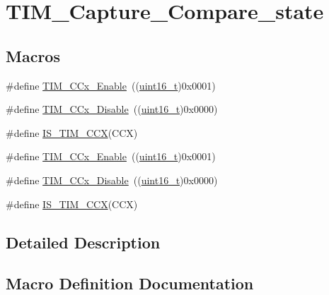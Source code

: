 \hypertarget{group___t_i_m___capture___compare__state}{}\section{T\+I\+M\+\_\+\+Capture\+\_\+\+Compare\+\_\+state}
\label{group___t_i_m___capture___compare__state}
\subsection*{Macros}
\begin{DoxyCompactItemize}
\item 
\#define \hyperlink{group___t_i_m___capture___compare__state_ga6acaeb60dad50ce9799ae9f62ed7719a}{T\+I\+M\+\_\+\+C\+Cx\+\_\+\+Enable}~((\hyperlink{_p_e___types_8h_a1f1825b69244eb3ad2c7165ddc99c956}{uint16\+\_\+t})0x0001)
\item 
\#define \hyperlink{group___t_i_m___capture___compare__state_gaa1441f66393b9daa9f97efb29b364cd3}{T\+I\+M\+\_\+\+C\+Cx\+\_\+\+Disable}~((\hyperlink{_p_e___types_8h_a1f1825b69244eb3ad2c7165ddc99c956}{uint16\+\_\+t})0x0000)
\item 
\#define \hyperlink{group___t_i_m___capture___compare__state_ga5b7461e8c9c25f6fa082118c95b02ba1}{I\+S\+\_\+\+T\+I\+M\+\_\+\+C\+CX}(C\+CX)
\item 
\#define \hyperlink{group___t_i_m___capture___compare__state_ga6acaeb60dad50ce9799ae9f62ed7719a}{T\+I\+M\+\_\+\+C\+Cx\+\_\+\+Enable}~((\hyperlink{_p_e___types_8h_a1f1825b69244eb3ad2c7165ddc99c956}{uint16\+\_\+t})0x0001)
\item 
\#define \hyperlink{group___t_i_m___capture___compare__state_gaa1441f66393b9daa9f97efb29b364cd3}{T\+I\+M\+\_\+\+C\+Cx\+\_\+\+Disable}~((\hyperlink{_p_e___types_8h_a1f1825b69244eb3ad2c7165ddc99c956}{uint16\+\_\+t})0x0000)
\item 
\#define \hyperlink{group___t_i_m___capture___compare__state_ga5b7461e8c9c25f6fa082118c95b02ba1}{I\+S\+\_\+\+T\+I\+M\+\_\+\+C\+CX}(C\+CX)
\end{DoxyCompactItemize}


\subsection{Detailed Description}


\subsection{Macro Definition Documentation}
